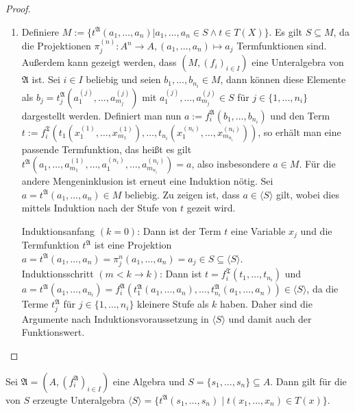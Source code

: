 \begin{proof}
\begin{enumerate}
        \item Definiere $M:=\{t^\mathfrak{A}(a_1,\ldots,a_n)\vert a_1,\ldots,a_n\in S\land t\in T(X)\}$.
        Es gilt $S\subseteq M$, da die Projektionen $\pi_j^{(n)}:A^n\to A, (a_1,\ldots,a_n)\mapsto a_j$ Termfunktionen sind.
        Außerdem kann gezeigt werden, dass $(M,(f_i)_{i\in I})$ eine Unteralgebra von $\mathfrak{A}$ ist. Sei $i\in I$ beliebig
        und seien $b_1,\ldots,b_{n_i}\in M$, dann können diese Elemente als $b_j=t_j^\mathfrak{A}(a_1^{(j)},\ldots,a_{m_j}^{(j)})$
        mit $a_1^{(j)},\ldots,a_{m_j}^{(j)}\in S$ für $j\in \{1,\ldots,n_i\}$ dargestellt werden. Definiert man nun $a:=f^\mathfrak{A}_i(b_1,\ldots,b_{n_i})$
        und den Term $t:=f_i^\mathfrak{T}(t_1(x_1^{(1)},\ldots,x_{m_1}^{(1)}),\ldots,t_{n_i}(x_1^{(n_i)},\ldots,x_{m_{n_i}}^{(n_i)}))$,
        so erhält man eine passende Termfunktion, das heißt es gilt $t^\mathfrak{A}(a_1,\ldots,a_{m_1}^{(1)},\ldots,a_1^{(n_i)},\ldots,a_{m_{n_i}}^{(n_i)})=a$,
        also insbesondere $a\in M$. Für die andere Mengeninklusion ist erneut eine Induktion nötig.
        Sei $a=t^\mathfrak{A}(a_1,\ldots,a_n)\in M$ beliebig. Zu zeigen ist, dass $a\in \langle S\rangle$ gilt,
        wobei dies mittels Induktion nach der Stufe von $t$ gezeit wird.

        Induktionsanfang $(k=0)$: Dann ist der Term $t$ eine Variable $x_j$ und die Termfunktion
        $t^\mathfrak{A}$ ist eine Projektion $a=t^\mathfrak{A}(a_1,\ldots,a_n)=\pi_j^n(a_1,\ldots,a_n)=a_j\in S\subseteq \langle S\rangle$.\\
        Induktionsschritt $(m<k\to k)$: Dann ist $t=f^\mathfrak{T}_i(t_1,\ldots,t_{n_i})$ und
        $a=t^\mathfrak{A}(a_1,\ldots,a_{n_i})=f^\mathfrak{A}_i(t^\mathfrak{A}_1(a_1,\ldots,a_n),\ldots,t^\mathfrak{A}_{n_i}(a_1,\ldots,a_n))\in\langle S\rangle$,
        da die Terme $t^\mathfrak{A}_j$ für $j\in\{1,\ldots,n_i\}$ kleinere Stufe als $k$ haben. Daher
        sind die Argumente nach Induktionsvoraussetzung in $\langle S\rangle$ und damit auch
        der Funktionswert.
    \end{enumerate}
\end{proof}

\begin{corollary}
    Sei $\mathfrak{A}=(A,(f^\mathfrak{A}_i)_{i\in I})$ eine Algebra und $S=\{s_1,\ldots,s_n\}\subseteq A$.
    Dann gilt für die von $S$ erzeugte Unteralgebra $\langle S\rangle=\{t^\mathfrak{A}(s_1,\ldots,s_n)\mid t(x_1,\ldots,x_n)\in T(x)\}$.
\end{corollary}

